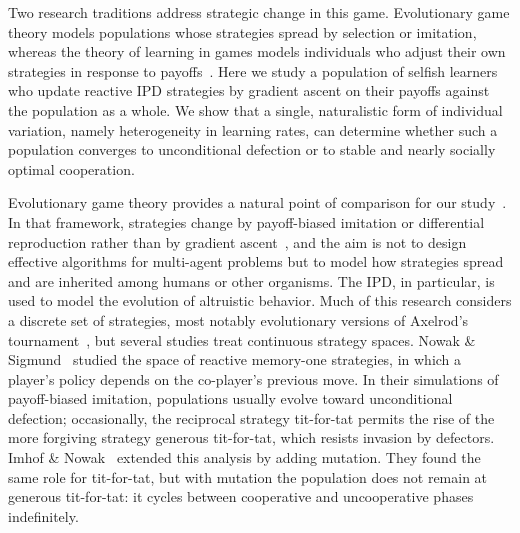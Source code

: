 \documentclass[10pt]{article}
\begin{document}
Two research traditions address strategic change in this game. Evolutionary game theory models populations whose strategies spread by selection or imitation, whereas the theory of learning in games models individuals who adjust their own strategies in response to payoffs~\cite{fudenberg1998-TheoryLearningGames}. Here we study a population of selfish learners who update reactive IPD strategies by gradient ascent on their payoffs against the population as a whole. We show that a single, naturalistic form of individual variation, namely heterogeneity in learning rates, can determine whether such a population converges to unconditional defection or to stable and nearly socially optimal cooperation.

Evolutionary game theory provides a natural point of comparison for our study~\cite{smith1982-EvolutionTheoryGames}. In that framework, strategies change by payoff-biased imitation or differential reproduction rather than by gradient ascent~\cite{taylor1978-EvolutionaryStableStrategies,hofbauer1998-EvolutionaryGamesPopulation}, and the aim is not to design effective algorithms for multi-agent problems but to model how strategies spread and are inherited among humans or other organisms. The IPD, in particular, is used to model the evolution of altruistic behavior. Much of this research considers a discrete set of strategies, most notably evolutionary versions of Axelrod's tournament~\cite{axelrod1981-EvolutionCooperation}, but several studies treat continuous strategy spaces. Nowak \& Sigmund~\cite{nowak1992-TitTatHeterogeneous} studied the space of reactive memory-one strategies, in which a player's policy depends on the co-player's previous move. In their simulations of payoff-biased imitation, populations usually evolve toward unconditional defection; occasionally, the reciprocal strategy tit-for-tat permits the rise of the more forgiving strategy generous tit-for-tat, which resists invasion by defectors.
Imhof \& Nowak~\cite{imhof2010-StochasticEvolutionaryDynamics} extended this analysis by adding mutation. They found the same role for tit-for-tat, but with mutation the population does not remain at generous tit-for-tat: it cycles between cooperative and uncooperative phases indefinitely.
\end{document}

